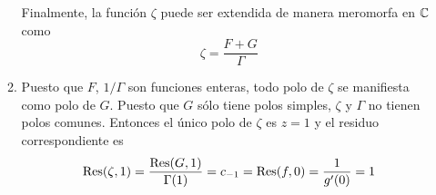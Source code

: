 \begin{solution}
\begin{enumerate}[label=\alph*)]
\begin{enumerate}[label=\arabic*)]
        Finalmente, la función $\zeta$ puede ser extendida de manera meromorfa en $\mathbb C$ como
        $$\zeta = \frac {F + G} \Gamma$$
        
        \item Puesto que $F$, $1/\Gamma$ son funciones enteras, todo polo de $\zeta$ se manifiesta como polo de $G$. Puesto que $G$ sólo tiene polos simples, $\zeta$ y $\Gamma$ no tienen polos comunes. Entonces el único polo de $\zeta$ es $z = 1$ y el residuo correspondiente es
        $$
        \operatorname{Res}(\zeta, 1)
            = \frac {\operatorname{Res}(G, 1)} {\Gamma(1)}
            = c_{-1}
            = \operatorname{Res}(f, 0)
            = \frac 1 {g'(0)}
            = 1
        $$
    \end{enumerate}
\end{enumerate}
\end{solution}
